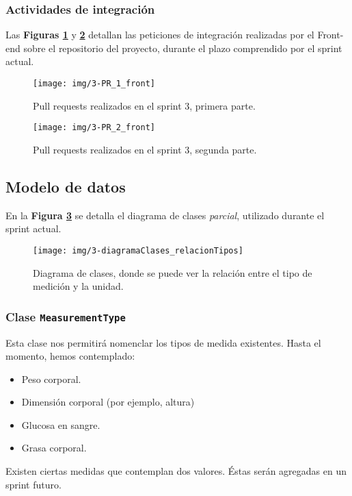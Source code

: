 \subsubsection{Actividades de integración}

Las \textbf{Figuras \ref{pull_request_sprint_3}} y \textbf{\ref{3-PR_back}} detallan las peticiones de integración realizadas por el Front-end sobre el repositorio del proyecto, durante el plazo comprendido por el sprint actual.

\begin{figure}[h]
  \centering
  \texttt{[image: img/3-PR\_1\_front]}
  \caption{Pull requests realizados en el sprint 3, primera parte.}
  \label{pull_request_sprint_3}
\end{figure}
\begin{figure}[h]
  \centering
  \texttt{[image: img/3-PR\_2\_front]}
  \caption{Pull requests realizados en el sprint 3, segunda parte.}
  \label{3-PR_back}
\end{figure}

\subsection{Modelo de datos}
\label{3-clases_involucradas}

En la \textbf{Figura \ref{relacion_tipo}} se detalla el diagrama de clases \textit{parcial}, utilizado durante el sprint actual.

\begin{figure}[h]
	\centering
	\texttt{[image: img/3-diagramaClases\_relacionTipos]}
	\caption{Diagrama de clases, donde se puede ver la relación entre el tipo de medición y la unidad.}
	\label{relacion_tipo}
\end{figure}


\subsubsection{Clase \texttt{MeasurementType}}

Esta clase nos permitirá nomenclar los tipos de medida existentes.
Hasta el momento, hemos contemplado:
\begin{itemize}
	\item Peso corporal.
	\item Dimensión corporal (por ejemplo, altura)
	\item Glucosa en sangre.
	\item Grasa corporal.
\end{itemize}
Existen ciertas medidas que contemplan dos valores.
Éstas serán agregadas en un sprint futuro.

